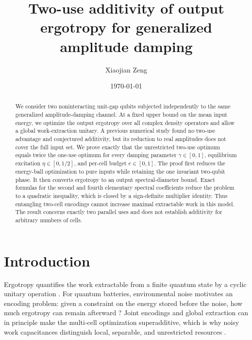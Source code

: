 \documentclass[pra,aps,twocolumn,nofootinbib,superscriptaddress]{revtex4-2}
\begin{document}
\title{Two-use additivity of output ergotropy for generalized amplitude damping}

\author{Xiaojian Zeng}

\date{\today}

\begin{abstract}
We consider two noninteracting unit-gap qubits subjected independently to the
same generalized amplitude-damping channel.  At a fixed upper bound on the
mean input energy, we optimize the output ergotropy over all complex density
operators and allow a global work-extraction unitary.  A previous numerical
study found no two-use advantage and conjectured additivity, but its reduction
to real amplitudes does not cover the full input set.  We prove exactly that
the unrestricted two-use optimum equals twice the one-use optimum for every
damping parameter $\gamma\in[0,1]$, equilibrium excitation
$\eta\in[0,1/2]$, and per-cell budget $e\in[0,1]$.  The proof first reduces
the energy-ball optimization to pure inputs while retaining the one invariant
two-qubit phase.  It then converts ergotropy to an output spectral-diameter
bound.  Exact formulas for the second and fourth elementary spectral
coefficients reduce the problem to a quadratic inequality, which is closed by
a sign-definite multiplier identity.  Thus entangling two-cell encodings
cannot increase maximal extractable work in this model.  The result concerns
exactly two parallel uses and does not establish additivity for arbitrary
numbers of cells.
\end{abstract}

\maketitle

\section{Introduction}

Ergotropy quantifies the work extractable from a finite quantum state by a
cyclic unitary operation \cite{allahverdyan2004}.  For quantum batteries,
environmental noise motivates an encoding problem: given a constraint on the
energy stored before the noise, how much ergotropy can remain afterward
\cite{alicki2013,tirone2021}?  Joint encodings and global extraction can in
principle make the multi-cell optimization superadditive, which is why noisy
work capacitances distinguish local, separable, and unrestricted resources
\cite{tirone2023,tirone2024}.
\end{document}
